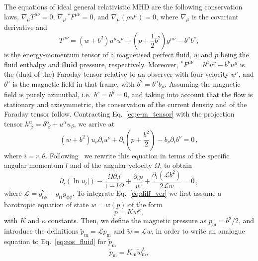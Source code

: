 \documentclass[]{aa}
\begin{document}
The equations of ideal general relativistic MHD are the following conservation laws, $\nabla_{\mu} T^{\mu\nu} = 0$, $\nabla_{\mu} \,^\ast F^{\mu\nu} = 0$, and 
$\nabla_{\mu} (\rho u^{\mu}) = 0$, 
where $\nabla_{\mu}$ is the covariant derivative and
\begin{equation}\label{eq:e-m_tensor}
T^{\mu\nu} = (w + b^2)u^{\mu}u^{\nu} + \left(p + \frac{1}{2}b^2\right)g^{\mu\nu} - b^{\mu}b^{\nu},
\end{equation}
is the energy-momentum tensor of a magnetised perfect fluid, $w$ and $p$ being the fluid enthalpy and {\bf fluid} pressure, respectively. 
Moreover, $^\ast F^{\mu\nu} = b^{\mu}u^{\nu} - b^{\nu}u^{\mu}$ is the (dual of the) Faraday tensor relative to an observer with 
four-velocity $u^{\mu}$, and $b^{\mu}$ is the magnetic field in that frame, with
$b^2=b^{\mu}b_{\mu}$. Assuming the magnetic field is purely azimuthal, i.e.~$b^r = b^{\theta} = 0$,
and taking into account that the flow is stationary and axisymmetric, the conservation of the current density and of the Faraday tensor follow. Contracting Eq.~\eqref{eq:e-m_tensor} with the projection tensor $h^{\alpha}_{\,\,\beta} = \delta^{\alpha}_{\,\,\beta} + u^{\alpha}u_{\beta}$, we arrive at
\begin{equation}
(w + b^2)u_{\nu}\partial_i u^{\nu} + \partial_i\left(p + \frac{b^2}{2}\right) - b_{\nu}\partial_i b^{\nu}=0\,,
\end{equation}
where $i = r, \theta$. Following~\cite{Komissarov:2006} we rewrite this equation in terms of the specific angular momentum $l$ and of the angular velocity $\Omega$, to obtain
\begin{equation}\label{eq:diff_ver}
\partial_i(\ln u_t|) - \frac{\Omega \partial_i l}{1-l\Omega} + \frac{\partial_i p}{w} + \frac{\partial_i(\mathcal{L}b^2)}{2\mathcal{L}w} = 0\,,
\end{equation}
where $\mathcal{L} = g_{t\phi}^2 - g_{tt}g_{\phi\phi}$.
To integrate Eq.~\eqref{eq:diff_ver} we first assume a barotropic equation of state $w = w(p)$ of the form
\begin{equation}\label{eq:eos_fluid}
p = K w^{\kappa},
\end{equation}
with $K$ and $\kappa$ constants.
Then, we define the magnetic pressure as $p_{\mathrm{m}} = b^2/2$, and introduce the definitions $\tilde{p}_{\mathrm{m}} = \mathcal{L} p_{\mathrm{m}}$ and $\tilde{w} = \mathcal{L} w$, in order to write an analogue equation to Eq.~\eqref{eq:eos_fluid} for $\tilde{p}_{\mathrm{m}}$~\citep{Komissarov:2006}
\begin{equation}\label{eq:eos_mag_tilde}
\tilde{p}_{\mathrm{m}} = K_{\mathrm{m}} \tilde{w}_{\mathrm{m}}^{\lambda
},
\end{equation}
\end{document}
